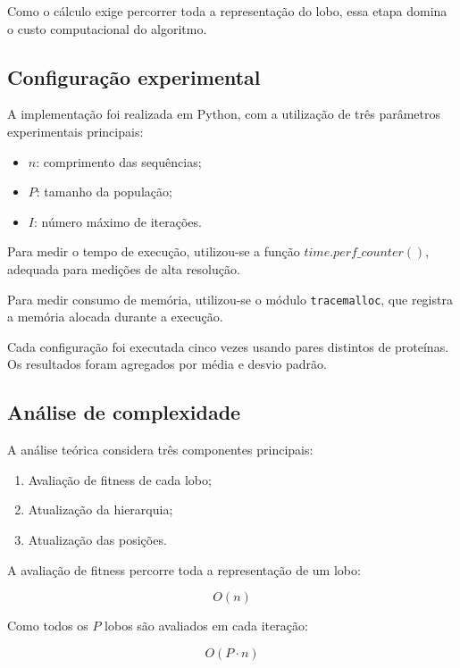 \documentclass[12pt]{article}
\begin{document}
Como o cálculo exige percorrer toda a representação do lobo, essa etapa domina o custo computacional do algoritmo.

\subsection{Configuração experimental}

A implementação foi realizada em Python, com a utilização de três parâmetros experimentais principais:

\begin{itemize}
    \item $n$: comprimento das sequências;
    \item $P$: tamanho da população;
    \item $I$: número máximo de iterações.
\end{itemize}

Para medir o tempo de execução, utilizou-se a função \texttt{$time.perf\_counter()$}, adequada para medições de alta resolução.

Para medir consumo de memória, utilizou-se o módulo \texttt{tracemalloc}, que registra a memória alocada durante a execução.

Cada configuração foi executada cinco vezes usando pares distintos de proteínas. Os resultados foram agregados por média e desvio padrão.

\subsection{Análise de complexidade}

A análise teórica considera três componentes principais:

\begin{enumerate}
    \item Avaliação de fitness de cada lobo;
    \item Atualização da hierarquia;
    \item Atualização das posições.
\end{enumerate}

A avaliação de fitness percorre toda a representação de um lobo:

\begin{equation}
    O(n)
\end{equation}

Como todos os $P$ lobos são avaliados em cada iteração:

\begin{equation}
    O(P \cdot n)
\end{equation}
\end{document}
